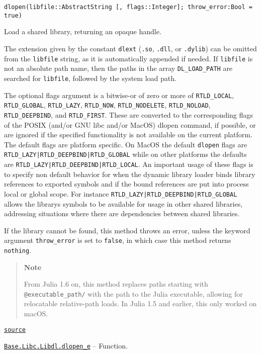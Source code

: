 \begin{adjustwidth}{2em}{0pt}


\begin{verbatim}
dlopen(libfile::AbstractString [, flags::Integer]; throw_error:Bool = true)
\end{verbatim}

Load a shared library, returning an opaque handle.

The extension given by the constant \texttt{dlext} (\texttt{.so}, \texttt{.dll}, or \texttt{.dylib}) can be omitted from the \texttt{libfile} string, as it is automatically appended if needed.   If \texttt{libfile} is not an absolute path name, then the paths in the array \texttt{DL\_LOAD\_PATH} are searched for \texttt{libfile}, followed by the system load path.

The optional flags argument is a bitwise-or of zero or more of \texttt{RTLD\_LOCAL}, \texttt{RTLD\_GLOBAL}, \texttt{RTLD\_LAZY}, \texttt{RTLD\_NOW}, \texttt{RTLD\_NODELETE}, \texttt{RTLD\_NOLOAD}, \texttt{RTLD\_DEEPBIND}, and \texttt{RTLD\_FIRST}. These are converted to the corresponding flags of the POSIX (and/or GNU libc and/or MacOS) dlopen command, if possible, or are ignored if the specified functionality is not available on the current platform. The default flags are platform specific. On MacOS the default \texttt{dlopen} flags are \texttt{RTLD\_LAZY|RTLD\_DEEPBIND|RTLD\_GLOBAL} while on other platforms the defaults are \texttt{RTLD\_LAZY|RTLD\_DEEPBIND|RTLD\_LOCAL}. An important usage of these flags is to specify non default behavior for when the dynamic library loader binds library references to exported symbols and if the bound references are put into process local or global scope. For instance \texttt{RTLD\_LAZY|RTLD\_DEEPBIND|RTLD\_GLOBAL} allows the library{\textquotesingle}s symbols to be available for usage in other shared libraries, addressing situations where there are dependencies between shared libraries.

If the library cannot be found, this method throws an error, unless the keyword argument \texttt{throw\_error} is set to \texttt{false}, in which case this method returns \texttt{nothing}.

\begin{quote}
\textbf{Note}

From Julia 1.6 on, this method replaces paths starting with \texttt{@executable\_path/} with  the path to the Julia executable, allowing for relocatable relative-path loads. In  Julia 1.5 and earlier, this only worked on macOS.

\end{quote}


\href{https://github.com/JuliaLang/julia/blob/9058264a69f9efc1af805c4473c946f87859b731/base/libdl.jl#L76-L107}{\texttt{source}}


\end{adjustwidth}
\hypertarget{15210978141445005995}{}
\hyperlink{15210978141445005995}{\texttt{Base.Libc.Libdl.dlopen\_e}}  -- {Function.}

